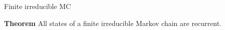 \documentclass[letterpaper, mathserif]{beamer}
\def\p{\mathrm P}
\begin{document}
\begin{frame}{Finite irreducible MC}

\textbf{Theorem} All states of a finite irreducible Markov chain are recurrent. 

\end{frame}


%
%
%
\end{document}
